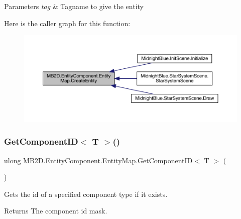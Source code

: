\begin{DoxyParams}{Parameters}
{\em tag} & Tagname to give the entity\\
\hline
\end{DoxyParams}
Here is the caller graph for this function\+:
\nopagebreak
\begin{figure}[H]
\begin{center}
\leavevmode
\includegraphics[width=350pt]{class_m_b2_d_1_1_entity_component_1_1_entity_map_a2461bfeb368018daadb2578c445f8fc2_icgraph}
\end{center}
\end{figure}
\hypertarget{class_m_b2_d_1_1_entity_component_1_1_entity_map_ad0a7991327281d908b72b33bc1944b70}{}\label{class_m_b2_d_1_1_entity_component_1_1_entity_map_ad0a7991327281d908b72b33bc1944b70} 
\subsubsection{\texorpdfstring{Get\+Component\+I\+D$<$ T $>$()}{GetComponentID< T >()}}
{\footnotesize\ttfamily ulong M\+B2\+D.\+Entity\+Component.\+Entity\+Map.\+Get\+Component\+ID$<$ T $>$ (\begin{DoxyParamCaption}{ }\end{DoxyParamCaption})\hspace{0.3cm}{\ttfamily [inline]}}



Gets the id of a specified component type if it exists. 

\begin{DoxyReturn}{Returns}
The component id mask.
\end{DoxyReturn}

